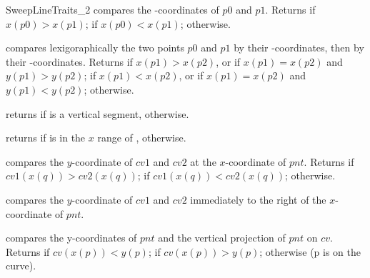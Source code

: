 \begin{ccRefConcept}{SweepLineTraits_2}
  {compares the -coordinates of $p0$ and $p1$.  Returns
   if $x(p0) > x(p1)$;  if $x(p0) < x(p1)$;
   otherwise.}
    
  {compares lexigoraphically the two points $p0$ and $p1$ by their
  -coordinates, then by their -coordinates.
  Returns  if $x(p1) > x(p2)$, or if
  $x(p1) = x(p2)$ and $y(p1) > y(p2)$;
   if $x(p1) < x(p2)$, or if $x(p1) = x(p2)$ and
  $y(p1) < y(p2)$;
   otherwise.}

  {returns  if  is a vertical segment, 
   otherwise.}

  {returns  if  is in the $x$ range of
  ,  otherwise.}
    
  {compares the $y$-coordinate of $cv1$ and $cv2$ at the $x$-coordinate 
  of $pnt$. Returns  if $cv1(x(q)) > cv2(x(q))$;
   if $cv1(x(q)) < cv2(x(q))$;  otherwise.
  }

  {compares the $y$-coordinate of $cv1$ and $cv2$ immediately to the right of
  the $x$-coordinate of $pnt$.
  }

  {compares the y-coordinates of $pnt$ and the vertical projection of $pnt$
  on $cv$. Returns  if $cv(x(p)) < y(p)$; 
  if $cv(x(p)) > y(p)$;  otherwise (p is on the curve).
  }
          

\end{ccRefConcept}
